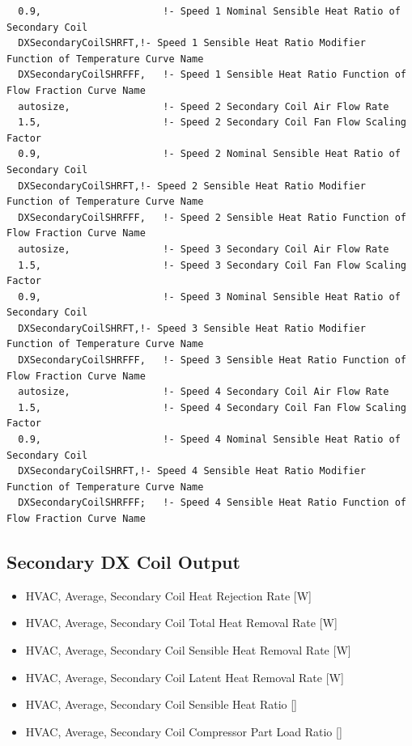 \begin{lstlisting}
  0.9,                     !- Speed 1 Nominal Sensible Heat Ratio of Secondary Coil
  DXSecondaryCoilSHRFT,!- Speed 1 Sensible Heat Ratio Modifier Function of Temperature Curve Name
  DXSecondaryCoilSHRFFF,   !- Speed 1 Sensible Heat Ratio Function of Flow Fraction Curve Name
  autosize,                !- Speed 2 Secondary Coil Air Flow Rate
  1.5,                     !- Speed 2 Secondary Coil Fan Flow Scaling Factor
  0.9,                     !- Speed 2 Nominal Sensible Heat Ratio of Secondary Coil
  DXSecondaryCoilSHRFT,!- Speed 2 Sensible Heat Ratio Modifier Function of Temperature Curve Name
  DXSecondaryCoilSHRFFF,   !- Speed 2 Sensible Heat Ratio Function of Flow Fraction Curve Name
  autosize,                !- Speed 3 Secondary Coil Air Flow Rate
  1.5,                     !- Speed 3 Secondary Coil Fan Flow Scaling Factor
  0.9,                     !- Speed 3 Nominal Sensible Heat Ratio of Secondary Coil
  DXSecondaryCoilSHRFT,!- Speed 3 Sensible Heat Ratio Modifier Function of Temperature Curve Name
  DXSecondaryCoilSHRFFF,   !- Speed 3 Sensible Heat Ratio Function of Flow Fraction Curve Name
  autosize,                !- Speed 4 Secondary Coil Air Flow Rate
  1.5,                     !- Speed 4 Secondary Coil Fan Flow Scaling Factor
  0.9,                     !- Speed 4 Nominal Sensible Heat Ratio of Secondary Coil
  DXSecondaryCoilSHRFT,!- Speed 4 Sensible Heat Ratio Modifier Function of Temperature Curve Name
  DXSecondaryCoilSHRFFF;   !- Speed 4 Sensible Heat Ratio Function of Flow Fraction Curve Name
\end{lstlisting}

\subsection{Secondary DX Coil Output}\label{secondary-dx-coil-output}

\begin{itemize}
\item
  HVAC, Average, Secondary Coil Heat Rejection Rate {[}W{]}
\item
  HVAC, Average, Secondary Coil Total Heat Removal Rate {[}W{]}
\item
  HVAC, Average, Secondary Coil Sensible Heat Removal Rate {[}W{]}
\item
  HVAC, Average, Secondary Coil Latent Heat Removal Rate {[}W{]}
\item
  HVAC, Average, Secondary Coil Sensible Heat Ratio {[]}
\item
  HVAC, Average, Secondary Coil Compressor Part Load Ratio {[]}
\end{itemize}

